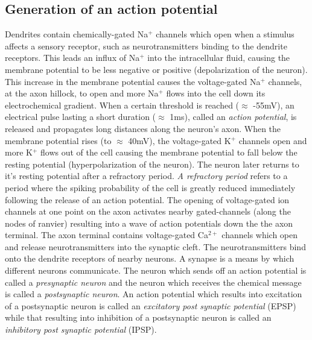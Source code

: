 \subsection{Generation of an action potential}
Dendrites contain chemically-gated Na$^{+}$ channels which open when 
a stimulus affects a sensory receptor, such as neurotransmitters binding to the dendrite receptors. This leads an influx of Na$^{+}$ into the intracellular fluid, causing the membrane potential to be less negative or positive (depolarization of the neuron). 
This increase in the membrane potential causes  the voltage-gated Na$^{+}$ channels, at the axon hillock, to open and more Na$^{+}$ flows into the cell down its electrochemical  gradient. When a certain threshold is reached ($\approx$ -55mV), an electrical pulse lasting  a short duration ($\approx$ 1ms),  called an \textit{action potential}, is released and propagates long distances along the neuron's axon. When the membrane potential rises (to  $\approx$ 40mV), the voltage-gated K$^{+}$ channels open and more K$^{+}$ flows out of the cell causing
the membrane potential to fall below the resting potential (hyperpolarization of the neuron).
The neuron later returns to it's resting potential after a refractory period.
\textit{A refractory period} refers to a period where the spiking probability of the cell is greatly reduced immediately following the release of an action potential.
The opening of voltage-gated ion channels at one point on the axon
activates nearby gated-channels (along the nodes of ranvier) resulting into a wave of action potentials down the the axon terminal. The axon terminal contains voltage-gated Ca$^{2+}$ channels which open and release neurotransmitters into the synaptic cleft. The neurotransmitters bind onto the dendrite receptors of nearby neurons.
A synapse is a means by which different neurons communicate. The neuron which sends off an action potential is called a \textit{presynaptic neuron} and the neuron which receives the 
chemical message is called a \textit{postsynaptic neuron}.
An action potential which results into excitation of a postsynaptic neuron is called an 
\textit{excitatory post synaptic potential} (EPSP) while that resulting into inhibition of a postsynaptic neuron is called an \textit{inhibitory post synaptic potential} (IPSP). 


